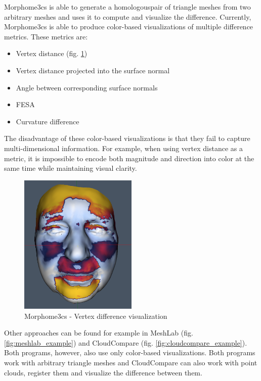 Morphome3cs is able to generate a homologous\footnotemark pair of triangle meshes from two arbitrary meshes and uses it to compute and visualize the difference. Currently, Morphome3cs is able to produce color-based visualizations of multiple difference metrics. These metrics are:

\begin{itemize}
\item Vertex distance (fig. \ref{fig:morpho_example})
\item Vertex distance projected into the surface normal
\item Angle between corresponding surface normals
\item FESA\footnotemark
\item Curvature difference
\end{itemize}

The disadvantage of these color-based visualizations is that they fail to capture multi-dimensional information. For example, when using vertex distance as a metric, it is impossible to encode both magnitude and direction into color at the same time while maintaining visual clarity.

\begin{figure}[h]
\centering
\includegraphics[width=0.5\textwidth]{./img/morpho-example01.PNG}
\caption{Morphome3cs - Vertex difference visualization}
\label{fig:morpho_example}
\end{figure}

Other approaches can be found for example in MeshLab (fig. \ref{fig:meshlab_example}) and CloudCompare (fig. \ref{fig:cloudcompare_example}). Both programs, however, also use only color-based visualizations. Both programs work with arbitrary triangle meshes and CloudCompare can also work with point clouds, register them and visualize the difference between them.

